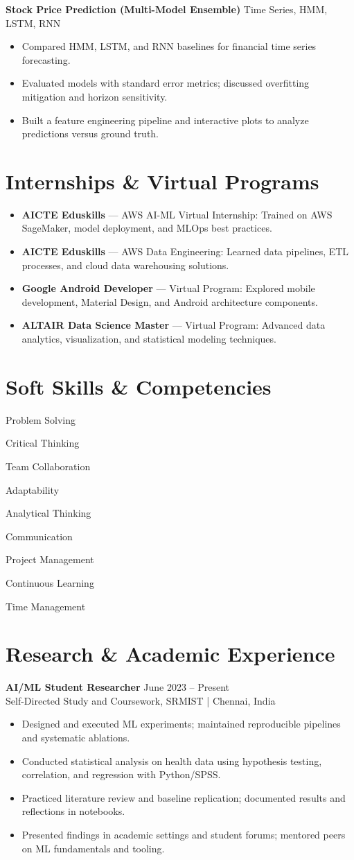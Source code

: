 \documentclass[10pt,a4paper]{article}
\newcommand{\tagpill}[1]{\colorbox{accentlight}{\strut\textcolor{accent}{\footnotesize #1}}}
\newcommand{\sect}[1]{\vspace{6pt}\section*{#1}\vspace{-2pt}}
\begin{document}
\textbf{Stock Price Prediction (Multi-Model Ensemble)} \hfill Time Series, HMM, LSTM, RNN\\
\begin{itemize}
  \item Compared HMM, LSTM, and RNN baselines for financial time series forecasting.
  \item Evaluated models with standard error metrics; discussed overfitting mitigation and horizon sensitivity.
  \item Built a feature engineering pipeline and interactive plots to analyze predictions versus ground truth.
\end{itemize}

\sect{Internships \& Virtual Programs}

\begin{itemize}
  \item \textbf{AICTE Eduskills} — AWS AI-ML Virtual Internship: Trained on AWS SageMaker, model deployment, and MLOps best practices.
  \item \textbf{AICTE Eduskills} — AWS Data Engineering: Learned data pipelines, ETL processes, and cloud data warehousing solutions.
  \item \textbf{Google Android Developer} — Virtual Program: Explored mobile development, Material Design, and Android architecture components.
  \item \textbf{ALTAIR Data Science Master} — Virtual Program: Advanced data analytics, visualization, and statistical modeling techniques.
\end{itemize}

\sect{Soft Skills \& Competencies}

\tagpill{Problem Solving} \; \tagpill{Critical Thinking} \; \tagpill{Team Collaboration} \; \tagpill{Adaptability} \; \tagpill{Analytical Thinking} \; \tagpill{Communication} \; \tagpill{Project Management} \; \tagpill{Continuous Learning} \; \tagpill{Time Management}



\sect{Research \& Academic Experience}

\textbf{AI/ML Student Researcher} \hfill June 2023 -- Present\\
Self-Directed Study and Coursework, SRMIST \;|\; Chennai, India\\
\begin{itemize}
  \item Designed and executed ML experiments; maintained reproducible pipelines and systematic ablations.
  \item Conducted statistical analysis on health data using hypothesis testing, correlation, and regression with Python/SPSS.
  \item Practiced literature review and baseline replication; documented results and reflections in notebooks.
  \item Presented findings in academic settings and student forums; mentored peers on ML fundamentals and tooling.
\end{itemize}
\end{document}
